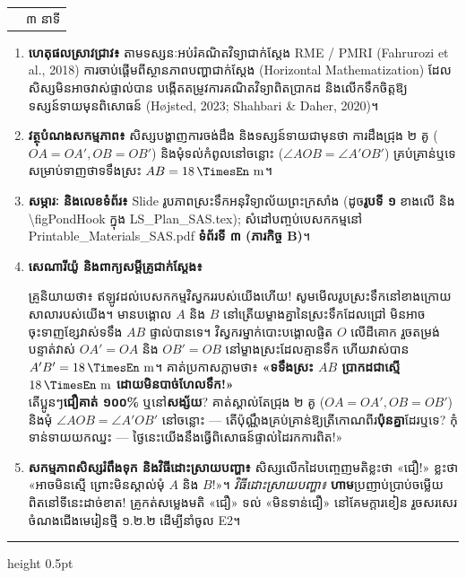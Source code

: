 \documentclass[a4paper,12pt]{article}
\makeatletter
\newcommand{\en}[1]{{\TimesEn #1}}
\newcommand{\enbf}[1]{{\TimesEn\textbf{#1}}}
\newcommand{\unit}[1]{\,\text{\en{#1}}}
\newcommand{\ang}[1]{\ensuremath{\angle #1}}
\newenvironment{phasebox}[3]{%
  \needspace{2.2cm}%
  \begin{tcolorbox}[
    enhanced, sharp corners, colback=headgray, colframe=black,
    boxrule=1.0pt, top=4pt, bottom=4pt, left=9pt, right=9pt,
    before skip=7pt, after skip=3pt
  ]%
    \renewcommand{\arraystretch}{1.0}%
    \begin{tabular*}{\linewidth}{@{}>{\raggedright\arraybackslash}p{13.60cm}@{\extracolsep{\fill}}r@{}}
      {\muol\fontsize{11pt}{17.5pt}\selectfont #1} & {\fontsize{10.5pt}{15pt}\selectfont\en{#2 |} #3}%
    \end{tabular*}%
  \end{tcolorbox}%
  \begingroup\fontsize{11.5pt}{18.2pt}\selectfont
}{%
  \par\endgroup\vspace{3pt}\hrule height 0.5pt\vspace{5pt}%
}
\makeatother
\begin{document}
\begin{phasebox}{ជំហានទី ២ \enbf{(}គ\enbf{)} \enbf{--- E1 Engage}៖ បេសកកម្មវាស់ទទឹងស្រះទឹកនៅអនុវិទ្យាល័យព្រះក្រសាំង}{08--11 min}{៣ នាទី}
  \begin{enumerate}[leftmargin=0.45cm, topsep=2pt, itemsep=4pt, parsep=0pt]
    \item \textbf{ហេតុផលស្រាវជ្រាវ៖} តាមទស្សនៈអប់រំគណិតវិទ្យាជាក់ស្ដែង \en{RME / PMRI (Fahrurozi et al., 2018)} ការចាប់ផ្ដើមពីស្ថានភាពបញ្ហាជាក់ស្ដែង (\en{Horizontal Mathematization}) ដែលសិស្សមិនអាចវាស់ផ្ទាល់បាន បង្កើតតម្រូវការគណិតវិទ្យាពិតប្រាកដ និងលើកទឹកចិត្តឱ្យទស្សន៍ទាយមុនពិសោធន៍ \en{(H\o jsted, 2023; Shahbari \& Daher, 2020)}។
    \item \textbf{វត្ថុបំណងសកម្មភាព៖} សិស្សបង្ហាញការចង់ដឹង និងទស្សន៍ទាយជាមុនថា ការដឹងជ្រុង ២ គូ ($OA=OA', OB=OB'$) និងមុំទល់កំពូលនៅចន្លោះ ($\ang{AOB}=\ang{A'OB'}$) គ្រប់គ្រាន់ឬទេសម្រាប់ទាញថាទទឹងស្រះ $AB = 18\unit{m}$។
    \item \textbf{សម្ភារៈ និងលេខទំព័រ៖} \en{Slide} រូបភាពស្រះទឹកអនុវិទ្យាល័យព្រះក្រសាំង (ដូច\textbf{រូបទី ១} ខាងលើ និង \en{\textbackslash figPondHook} ក្នុង \en{LS\_Plan\_SAS.tex}); សំដៅបញ្ចប់បេសកកម្មនៅ \en{Printable\_Materials\_SAS.pdf} \textbf{ទំព័រទី ៣ (ភារកិច្ច B)}។
    \item \textbf{សេណារីយ៉ូ និងពាក្យសម្ដីគ្រូជាក់ស្ដែង៖}
      \begin{scriptbox}
        {\muol\fontsize{10.8pt}{17pt}\selectfont \enbf{«}គ្រូនិយាយថា៖} ឥឡូវដល់បេសកកម្មវិស្វកររបស់យើងហើយ! សូមមើលរូបស្រះទឹកនៅខាងក្រោយសាលារបស់យើង។ មានបង្គោល $A$ និង $B$ នៅត្រើយម្ខាងគ្នានៃស្រះទឹកដែលជ្រៅ មិនអាចចុះទាញខ្សែវាស់ទទឹង $AB$ ផ្ទាល់បានទេ។ វិស្វករម្នាក់បោះបង្គោលផ្ចិត $O$ លើដីគោក រួចតម្រង់បន្ទាត់វាស់ $OA' = OA$ និង $OB' = OB$ នៅម្ខាងស្រះដែលគ្មានទឹក ហើយវាស់បាន $A'B' = 18\unit{m}$។ គាត់ប្រកាសភ្លាមថា៖ \textbf{«ទទឹងស្រះ $AB$ ប្រាកដជាស្មើ $18\unit{m}$ ដោយមិនបាច់ហែលទឹក!»}\\
        តើប្អូនៗ\textbf{ជឿគាត់ ១០០\%} ឬនៅ\textbf{សង្ស័យ}? គាត់ស្គាល់តែជ្រុង ២ គូ ($OA=OA', OB=OB'$) និងមុំ $\ang{AOB}=\ang{A'OB'}$ នៅចន្លោះ — តើប៉ុណ្ណឹងគ្រប់គ្រាន់ឱ្យត្រីកោណពីរ\textbf{ប៉ុនគ្នា}ដែរឬទេ? កុំទាន់ទាយយកឈ្នះ — ថ្ងៃនេះយើងនឹងធ្វើពិសោធន៍ផ្ទាល់ដៃរកការពិត!»
      \end{scriptbox}
    \item \textbf{សកម្មភាពសិស្សរំពឹងទុក និងវិធីដោះស្រាយបញ្ហា៖} សិស្សលើកដៃបញ្ចេញមតិខ្លះថា «ជឿ!» ខ្លះថា «អាចមិនស្មើ ព្រោះមិនស្គាល់មុំ $A$ និង $B$!»។ \textit{វិធីដោះស្រាយបញ្ហា៖} \textbf{ហាម}ប្រញាប់ប្រាប់ចម្លើយពិតនៅទីនេះដាច់ខាត! គ្រូកត់សម្លេងមតិ «ជឿ» ទល់ «មិនទាន់ជឿ» នៅគែមក្ដារខៀន រួចសរសេរចំណងជើងមេរៀនថ្មី ១.២.២ ដើម្បីនាំចូល \en{E2}។
  \end{enumerate}
\end{phasebox}
\end{document}
